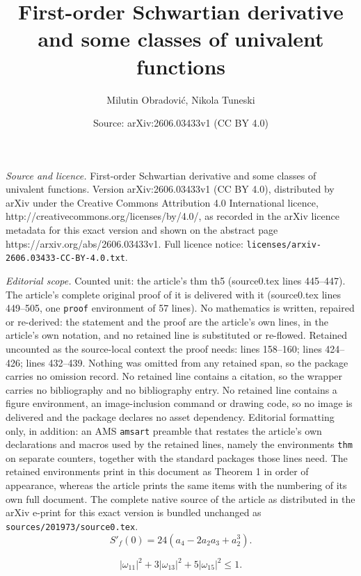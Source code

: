 \documentclass[10pt,a4paper]{amsart}
\title{First-order Schwartian derivative and some classes of univalent functions}
\author{Milutin Obradovi\'{c}, Nikola Tuneski}
\date{Source: arXiv:2606.03433v1 (CC BY 4.0)}
\begin{document}
\maketitle

\noindent\emph{Source and licence.} First-order Schwartian derivative and some classes of univalent functions. Version arXiv:2606.03433v1 (CC BY 4.0), distributed by arXiv under the Creative Commons Attribution 4.0 International licence, http://creativecommons.org/licenses/by/4.0/, as recorded in the arXiv licence metadata for this exact version and shown on the abstract page https://arxiv.org/abs/2606.03433v1. Full licence notice: \texttt{licenses/arxiv-2606.03433-CC-BY-4.0.txt}.\par\smallskip

\noindent\textit{Editorial scope.} Counted unit: the article's thm th5 (source0.tex lines 445--447). The article's complete original proof of it is delivered with it (source0.tex lines 449--505, one \texttt{proof} environment of 57 lines). No mathematics is written, repaired or re-derived: the statement and the proof are the article's own lines, in the article's own notation, and no retained line is substituted or re-flowed.  Retained uncounted as the source-local context the proof needs: lines 158--160; lines 424--426; lines 432--439.  Nothing was omitted from any retained span, so the package carries no omission record.  No retained line contains a citation, so the wrapper carries no bibliography and no bibliography entry.  No retained line contains a figure environment, an image-inclusion command or drawing code, so no image is delivered and the package declares no asset dependency.  Editorial formatting only, in addition: an AMS \texttt{amsart} preamble that restates the article's own declarations and macros used by the retained lines, namely the environments \texttt{thm} on separate counters, together with the standard packages those lines need.  The retained environments print in this document as Theorem 1 in order of appearance, whereas the article prints the same items with the numbering of its own full document.  The complete native source of the article as distributed in the arXiv e-print for this exact version is bundled unchanged as \texttt{sources/201973/source0.tex}.
\begin{equation}\label{eq-2}
S'_{f}(0)=24(a_{4}-2a_{2}a_{3}+a_{2}^{3}).
\end{equation}

\begin{equation}\label{eq-16}
  |\omega_{11}|^2 + 3 |\omega_{13}|^2 + 5|\omega_{15}|^2 \leq1.
\end{equation}
\end{document}
